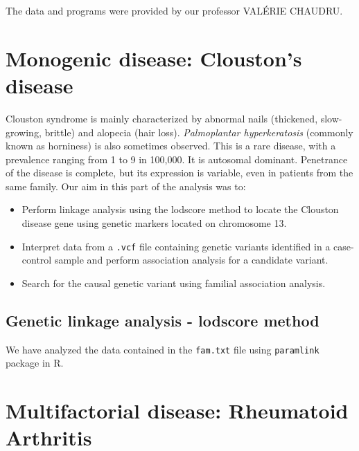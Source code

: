 \documentclass[a4paper,12pt]{article}
\begin{document}
 
The data and programs were provided by our professor VALÉRIE CHAUDRU.

\section{Monogenic disease: Clouston's disease}

Clouston syndrome is mainly characterized by abnormal nails (thickened, slow-growing, brittle) and alopecia (hair loss). \textit{Palmoplantar hyperkeratosis} (commonly known as horniness) is also sometimes observed. 
This is a rare disease, with a prevalence ranging from 1 to 9 in 100,000. It is autosomal dominant. Penetrance of the disease is complete, but its expression is variable, even in patients from the same family.
Our aim in this part of the analysis was to:

\begin{itemize}
    \item Perform linkage analysis using the lodscore method to locate the Clouston disease gene using genetic markers located on chromosome 13.
    \item Interpret data from a \texttt{.vcf} file containing genetic variants identified in a case-control sample and perform association analysis for a candidate variant.
    \item Search for the causal genetic variant using familial association analysis.
\end{itemize}

\subsection{Genetic linkage analysis - lodscore method}

We have analyzed the data contained in the \texttt{fam.txt} file using \texttt{paramlink} package in R. 

\section{Multifactorial disease: Rheumatoid Arthritis}
\end{document}
